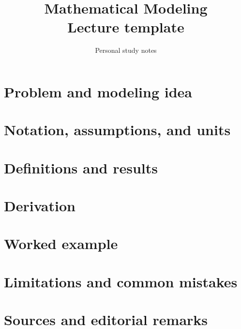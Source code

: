 \documentclass[11pt,a4paper]{article}
\title{\textbf{Mathematical Modeling}\\[2mm]\large Lecture template}
\author{Personal study notes}
\date{}
\begin{document}
\maketitle
\tableofcontents
\section{Problem and modeling idea}\label{sec:problem}
\section{Notation, assumptions, and units}\label{sec:assumptions}
\section{Definitions and results}\label{sec:results}
\section{Derivation}\label{sec:derivation}
\section{Worked example}\label{sec:example}
\section{Limitations and common mistakes}\label{sec:limitations}
\section{Sources and editorial remarks}\label{sec:sources}
\end{document}
